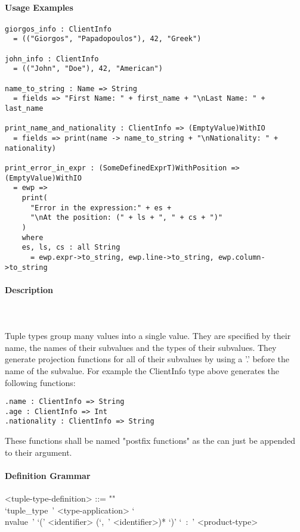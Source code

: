 \documentclass{article}
\def\pend{\mbox{} \\\\}
\begin{document}
\paragraph{Usage Examples}

\begin{verbatim}
giorgos_info : ClientInfo
  = (("Giorgos", "Papadopoulos"), 42, "Greek")

john_info : ClientInfo
  = (("John", "Doe"), 42, "American")

name_to_string : Name => String
  = fields => "First Name: " + first_name + "\nLast Name: " + last_name

print_name_and_nationality : ClientInfo => (EmptyValue)WithIO
  = fields => print(name -> name_to_string + "\nNationality: " + nationality)

print_error_in_expr : (SomeDefinedExprT)WithPosition => (EmptyValue)WithIO
  = ewp =>
    print(
      "Error in the expression:" + es +
      "\nAt the position: (" + ls + ", " + cs + ")"
    )
    where
    es, ls, cs : all String
      = ewp.expr->to_string, ewp.line->to_string, ewp.column->to_string
\end{verbatim}

\paragraph{Description}\pend
Tuple types group many values into a single value. They are specified by their name,
the names of their subvalues and the types of their subvalues. They generate 
projection functions for all of their subvalues by using a '.' before the name of 
the subvalue. For example the ClientInfo type above generates the following 
functions:
\begin{verbatim}
.name : ClientInfo => String
.age : ClientInfo => Int
.nationality : ClientInfo => String
\end{verbatim}
These functions shall be named "postfix functions" as the can just be appended to
their argument.

\paragraph{Definition Grammar}
\begin{grammar}
<tuple-type-definition> ::= ""\\
`tuple_type\ ' <type-application>
`\\nvalue\ ' `(' <identifier> (`,\ ' <identifier>)* `)' `\ :\ ' <product-type>
\end{grammar}
\end{document}
